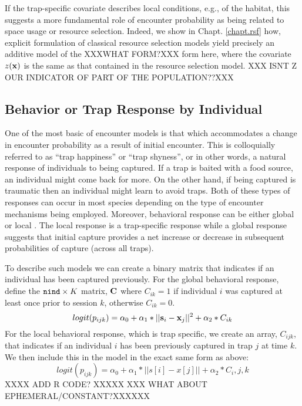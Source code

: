 If the trap-specific covariate describes local conditions, e.g., of
the habitat, this suggests a more fundamental role of encounter
probability as being related to space usage or resource
selection. Indeed, we show in Chapt. \ref{chapt.rsf} how, explicit
formulation of classical 
resource selection models yield precisely an additive model of the XXXWHAT FORM?XXX
form here, where the covariate $z({\bf x})$ is the same as that
contained in the resource selection model. XXX ISNT Z OUR INDICATOR OF PART OF THE POPULATION??XXX 









\subsection{Behavior or Trap Response by Individual}

One of the most basic of encounter models is that which accommodates a
change in encounter probability as a result of initial encounter.
This is colloquially referred to as ``trap happiness'' or ``trap shyness'', or in other words, a
natural response of individuals to being captured. If a trap is baited
with a food source, an individual might come back for
more. On the other hand, if being captured is traumatic then an
individual might learn to avoid traps. Both of these types of
responses can occur in most species depending on the type of encounter
mechanisms being employed. Moreover, behavioral response can be either
global \citep{gardner_etal:2010} or local \citep{royle_etal:2009jwm}.
The local response is a trap-specific response 
while a global response suggests that
initial capture provides a net increase or decrease in subsequent probabilities of capture (across all
traps).

To describe such models we can create a binary matrix that indicates
if an individual has been captured previously.  For the global
behavioral response, define the $\mbox{\tt nind} \times K$ matrix,
${\bf C}$ where $C_{ik} =1$
if individual $i$ was captured at least once prior to session
$k$, otherwise $C_{ik} = 0$.
\[
logit(p_{ijk}) = \alpha_{0} + \alpha_1 *||{\bf s}_{i}-{\bf x}_{j}||^{2} + \alpha_2*C_{ik}
\]
For the local behavioral response, which is trap specific, we create
an array, $C_{ijk}$, that indicates if an individual $i$ has been
previously captured in trap $j$ at time $k$.  We then include this in
the model in the exact same form as above:
\[
logit(p_{ijk}) = \alpha_{0} + \alpha_1*||s[i]-x[j]|| + \alpha_2*C_i,j,k
\]
XXXX ADD R CODE? XXXXX
XXX WHAT ABOUT EPHEMERAL/CONSTANT?XXXXXX

